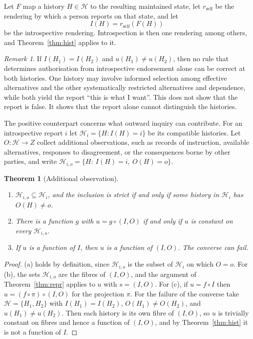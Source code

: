 \documentclass[11pt]{article}
\newtheorem{theorem}{Theorem}
\theoremstyle{definition}
\theoremstyle{remark}
\newtheorem{remark}{Remark}
\begin{document}
Let $F$ map a history $H\in\mathcal H$ to the resulting maintained state, let $r_{\mathrm{self}}$ be the rendering by which a person reports on that state, and let
\[
I(H)=r_{\mathrm{self}}(F(H))
\]
be the introspective rendering. Introspection is then one rendering among others, and Theorem~\ref{thm:hist} applies to it.

\begin{remark}\label{rem:endorse}
If $I(H_1)=I(H_2)$ and $u(H_1)\neq u(H_2)$, then no rule that determines authorisation from introspective endorsement alone can be correct at both histories. One history may involve informed selection among effective alternatives and the other systematically restricted alternatives and dependence, while both yield the report ``this is what I want''. This does not show that the report is false. It shows that the report alone cannot distinguish the histories.
\end{remark}

The positive counterpart concerns what outward inquiry can contribute. For an introspective report $i$ let $\mathcal H_i=\{H:I(H)=i\}$ be its compatible histories. Let $O:\mathcal H\to Z$ collect additional observations, such as records of instruction, available alternatives, responses to disagreement, or the consequences borne by other parties, and write $\mathcal H_{i,o}=\{H:\ I(H)=i,\ O(H)=o\}$.

\begin{theorem}[Additional observation]\label{thm:obs}
\begin{enumerate}[label=(\alph*),leftmargin=2em,itemsep=0pt]
\item $\mathcal H_{i,o}\subseteq\mathcal H_i$, and the inclusion is strict if and only if some history in $\mathcal H_i$ has $O(H)\neq o$.
\item There is a function $g$ with $u=g\circ(I,O)$ if and only if $u$ is constant on every $\mathcal H_{i,o}$.
\item If $u$ is a function of $I$, then $u$ is a function of $(I,O)$. The converse can fail.
\end{enumerate}
\end{theorem}
\begin{proof}
(a) holds by definition, since $\mathcal H_{i,o}$ is the subset of $\mathcal H_i$ on which $O=o$. For (b), the sets $\mathcal H_{i,o}$ are the fibres of $(I,O)$, and the argument of Theorem~\ref{thm:repr} applies to $u$ with $s=(I,O)$. For (c), if $u=f\circ I$ then $u=(f\circ\pi)\circ(I,O)$ for the projection $\pi$. For the failure of the converse take $\mathcal H=\{H_1,H_2\}$ with $I(H_1)=I(H_2)$, $O(H_1)\neq O(H_2)$, and $u(H_1)\neq u(H_2)$. Then each history is its own fibre of $(I,O)$, so $u$ is trivially constant on fibres and hence a function of $(I,O)$, and by Theorem~\ref{thm:hist} it is not a function of $I$. \qedhere
\end{proof}
\end{document}
